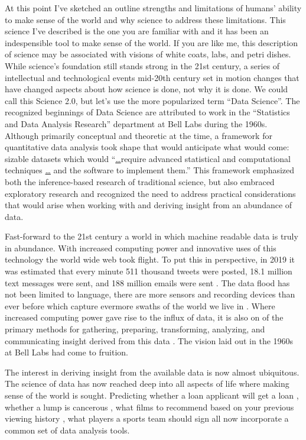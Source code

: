 \documentclass[
]{article}
\begin{document}
At this point I've sketched an outline strengths and limitations of humans' ability to make sense of the world and why science to address these limitations. This science I've described is the one you are familiar with and it has been an indespensible tool to make sense of the world. If you are like me, this description of science may be associated with visions of white coats, labs, and petri dishes. While science's foundation still stands strong in the 21st century, a series of intellectual and technological events mid-20th century set in motion changes that have changed aspects about how science is done, not why it is done. We could call this Science 2.0, but let's use the more popularized term ``Data Science''. The recognized beginnings of Data Science are attributed to work in the ``Statistics and Data Analysis Research'' department at Bell Labs during the 1960s. Although primarily conceptual and theoretic at the time, a framework for quantitative data analysis took shape that would anticipate what would come: sizable datasets which would ``\protect\hyperlink{section-1}{\ldots{}}require advanced statistical and computational techniques \protect\hyperlink{section-1}{\ldots{}} and the software to implement them.'' \citep{Chambers2020} This framework emphasized both the inference-based research of traditional science, but also embraced exploratory research and recognized the need to address practical considerations that would arise when working with and deriving insight from an abundance of data.

Fast-forward to the 21st century a world in which machine readable data is truly in abundance. With increased computing power and innovative uses of this technology the world wide web took flight. To put this in perspective, in 2019 it was estimated that every minute 511 thousand tweets were posted, 18.1 million text messages were sent, and 188 million emails were sent \citep{DataNeverSleeps08-2021}. The data flood has not been limited to language, there are more sensors and recording devices than ever before which capture evermore swaths of the world we live in \citep{Desjardins2019}. Where increased computing power gave rise to the influx of data, it is also on of the primary methods for gathering, preparing, transforming, analyzing, and communicating insight derived from this data \citep{Donoho2017}. The vision laid out in the 1960s at Bell Labs had come to fruition.

The interest in deriving insight from the available data is now almost ubiquitous. The science of data has now reached deep into all aspects of life where making sense of the world is sought. Predicting whether a loan applicant will get a loan \citep{Bao2019}, whether a lump is cancerous \citep{Saxena2020}, what films to recommend based on your previous viewing history \citep{Gomez-Uribe2015}, what players a sports team should sign \citep{Lewis2004} all now incorporate a common set of data analysis tools.
\end{document}
